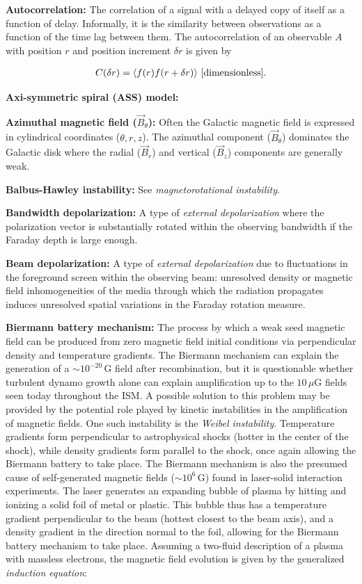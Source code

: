 \documentclass[a4paper,10pt]{article}
\begin{document}
{\noindent}\textbf{Autocorrelation:} The correlation of a signal with a delayed copy of itself as a function of delay. Informally, it is the similarity between observations as a function of the time lag between them. The autocorrelation of an observable $A$ with position $r$ and position increment $\delta r$ is given by

\begin{align*}
    C(\delta r) = \langle f(r)f(r+\delta r)\rangle ~ [{\rm dimensionless}].
\end{align*}

{\noindent}\textbf{Axi-symmetric spiral (ASS) model:}

{\noindent}\textbf{Azimuthal magnetic field ($\vec{B}_\theta$):} Often the Galactic magnetic field is expressed in cylindrical coordinates ($\theta, r, z$). The azimuthal component ($\vec{B}_\theta$) dominates the Galactic disk where the radial ($\vec{B}_r$) and vertical ($\vec{B}_z$) components are generally weak.

{\noindent}\textbf{Balbus-Hawley instability:} See \textit{magnetorotational instability}.

{\noindent}\textbf{Bandwidth depolarization:} A type of \textit{external depolarization} where the polarization vector is substantially rotated within the observing bandwidth if the Faraday depth is large enough.

{\noindent}\textbf{Beam depolarization:} A type of \textit{external depolarization} due to fluctuations in the foreground screen within the observing beam: unresolved density or magnetic field inhomogeneities of the media through which the radiation propagates induces unresolved spatial variations in the Faraday rotation measure.

{\noindent}\textbf{Biermann battery mechanism:} The process by which a weak seed magnetic field can be produced from zero magnetic field initial conditions via perpendicular density and temperature gradients. The Biermann mechanism can explain the generation of a $\sim10^{-20}\,$G field after recombination, but it is questionable whether turbulent dynamo growth alone can explain amplification up to the $10\,\mu$G fields seen today throughout the ISM. A possible solution to this problem may be provided by the potential role played by kinetic instabilities in the amplification of magnetic fields. One such instability is the \textit{Weibel instability}. Temperature gradients form perpendicular to astrophysical shocks (hotter in the center of the shock), while density gradients form parallel to the shock, once again allowing the Biermann battery to take place. The Biermann mechanism is also the presumed cause of self-generated magnetic fields ($\sim10^6\,$G) found in laser-solid interaction experiments. The laser generates an expanding bubble of plasma by hitting and ionizing a solid foil of metal or plastic. This bubble thus has a temperature gradient perpendicular to the beam (hottest closest to the beam axis), and a density gradient in the direction normal to the foil, allowing for the Biermann battery mechanism to take place. Assuming a two-fluid description of a plasma with massless electrons, the magnetic field evolution is given by the generalized \textit{induction equation}:
\end{document}
